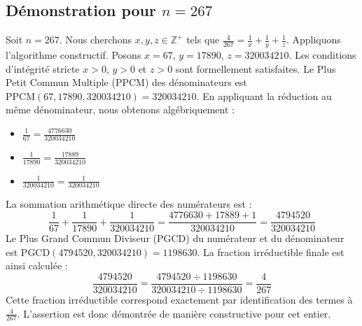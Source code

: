\documentclass[11pt,a4paper]{article}
\begin{document}
\subsection{Démonstration pour $n = 267$}
Soit $n = 267$. Nous cherchons $x, y, z \in \mathbb{Z}^{+}$ tels que $\frac{4}{267} = \frac{1}{x} + \frac{1}{y} + \frac{1}{z}$.
Appliquons l'algorithme constructif. Posons $x = 67$, $y = 17890$, $z = 320034210$.
Les conditions d'intégrité stricte $x > 0$, $y > 0$ et $z > 0$ sont formellement satisfaites.
Le Plus Petit Commun Multiple (PPCM) des dénominateurs est $\text{PPCM}(67, 17890, 320034210) = 320034210$.
En appliquant la réduction au même dénominateur, nous obtenons algébriquement :
\begin{itemize}
    \item $\frac{1}{67} = \frac{4776630}{320034210}$
    \item $\frac{1}{17890} = \frac{17889}{320034210}$
    \item $\frac{1}{320034210} = \frac{1}{320034210}$
\end{itemize}
La sommation arithmétique directe des numérateurs est :
$$ \frac{1}{67} + \frac{1}{17890} + \frac{1}{320034210} = \frac{4776630 + 17889 + 1}{320034210} = \frac{4794520}{320034210} $$
Le Plus Grand Commun Diviseur (PGCD) du numérateur et du dénominateur est $\text{PGCD}(4794520, 320034210) = 1198630$.
La fraction irréductible finale est ainsi calculée :
$$ \frac{4794520}{320034210} = \frac{4794520 \div 1198630}{320034210 \div 1198630} = \frac{4}{267} $$
Cette fraction irréductible correspond exactement par identification des termes à $\frac{4}{267}$. L'assertion est donc démontrée de manière constructive pour cet entier.
\end{document}
